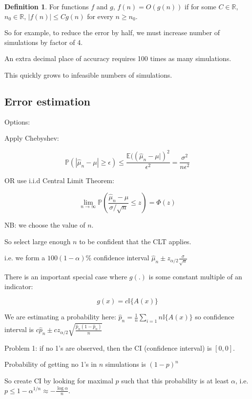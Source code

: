 \documentclass[12pt,a4paper]{article}
\theoremstyle{definition}
\newtheorem{definition}{Definition}[subsection]
\begin{document}
\begin{definition}
	For functions $f$ and $g$, $f(n) = O(g(n))$ if for some $C \in \mathbb{R}$, $n_0 \in \mathbb{R}$, $|f(n)| \le C g(n)$ for every $n \ge n_0$.
\end{definition}

So for example, to reduce the error by half, we must increase number of simulations by factor of 4.

An extra decimal place of accuracy requires 100 times as many simulations.

This quickly grows to infeasible numbers of simulations.

\subsection{Error estimation}

Options:

Apply Chebyshev:

\[\mathbb{P}(|\hat{\mu}_n - \mu| \ge \epsilon) \le \frac{\mathbb{E}((\hat{\mu}_n - \mu|)^2}{\epsilon^2} = \frac{\sigma^2}{n \epsilon^2}\]

OR use i.i.d Central Limit Theorem:

\[\lim_{n \rightarrow \infty} \mathbb{P}(\frac{\hat{\mu}_n - \mu}{\sigma / \sqrt{n}} \le z) = \Phi (z)\]

NB: we choose the value of $n$.

So select large enough $n$ to be confident that the CLT applies.

i.e. we form a $100(1 - \alpha)\%$ confidence interval $\hat{\mu}_n \pm z_{\alpha / 2} \frac{\sigma}{\sqrt{n}}$

There is an important special case where $g(.)$ is some constant multiple of an indicator:

\[g(x) = c \mathbb{I} \{A(x)\}\]

We are estimating a probability here: $\hat{p}_n = \frac{1}{n} \sum_{i = 1}{n} \mathbb{I} \{ A(x) \}$ so confidence interval is $c\hat{p}_n \pm c z_{\alpha / 2} \sqrt{\frac{\hat{p}_n(1 - \hat{p}_n)}{n}}$

Problem 1: if no 1's are observed, then the CI (confidence interval) is $[0, 0]$.

Probability of getting no 1's in $n$ simulations is ${(1 - p)}^n$

So create CI by looking for maximal $p$ such that this probability is at least $\alpha$, i.e. $p \le 1 - \alpha^{1 / n} \approx -\frac{\log \alpha}{n}$.
\end{document}

